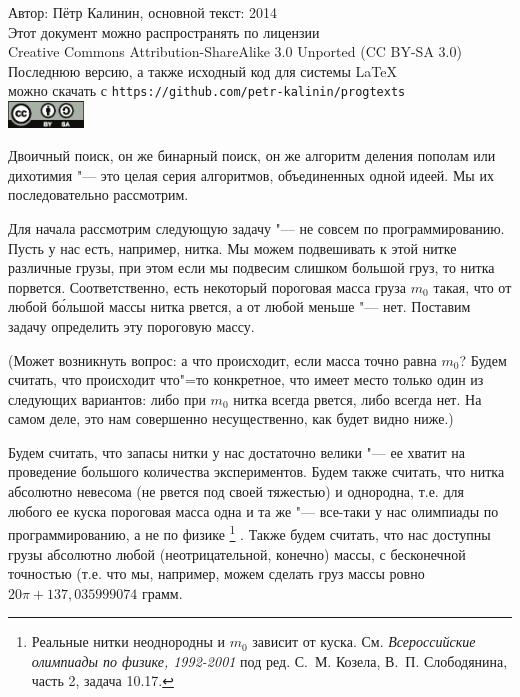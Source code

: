 \documentclass[a4paper,10pt]{problems}
\begin{document}
\begin{flushright}
Автор: Пётр Калинин, основной текст: 2014\\
Этот документ можно распространять по лицензии\\
Creative Commons Attribution-ShareAlike 3.0 Unported (CC BY-SA 3.0)\\
Последнюю версию, а также исходный код для системы \LaTeX\\
можно скачать с \verb`https://github.com/petr-kalinin/progtexts`\\
\includegraphics[width=2cm]{by-sa-corr.eps}
\end{flushright}


Двоичный поиск, он же бинарный поиск, он же алгоритм деления пополам или дихотимия "--- это целая серия алгоритмов, объединенных одной идеей. 
Мы их последовательно рассмотрим.


Для начала рассмотрим следующую задачу "--- не совсем по программированию. Пусть у нас есть, например, нитка. 
Мы можем подвешивать к этой нитке различные грузы, при этом если мы подвесим слишком большой груз, то нитка порвется. 
Соответственно, есть некоторый пороговая масса груза $m_0$ такая, что от любой б\'{о}льшой массы нитка рвется, а от любой меньше "--- нет.
Поставим задачу определить эту пороговую массу.

(Может возникнуть вопрос: а что происходит, если масса точно равна $m_0$? 
Будем считать, что происходит что"=то конкретное, что имеет место только один из следующих вариантов: либо при $m_0$ нитка всегда рвется, либо всегда нет.
На самом деле, это нам совершенно несущественно, как будет видно ниже.)

Будем считать, что запасы нитки у нас достаточно велики "--- ее хватит на проведение большого количества экспериментов.
Будем также считать, что нитка абсолютно невесома (не рвется под своей тяжестью) и однородна, 
т.е. для любого ее куска пороговая масса одна и та же "--- все-таки у нас олимпиады по программированию, а не по физике%
\footnote{Реальные нитки неоднородны и $m_0$ зависит от куска. 
См. \textit{Всероссийские олимпиады по физике, 1992-2001} под ред. С.~М. Козела, В.~П. Слободянина, часть 2, задача 10.17.}%
.
Также будем считать, что нас доступны грузы абсолютно любой (неотрицательной, конечно) массы, с бесконечной точностью 
(т.е. что мы, например, можем сделать груз массы ровно $20\pi+137,035999074$ грамм.
\end{document}
